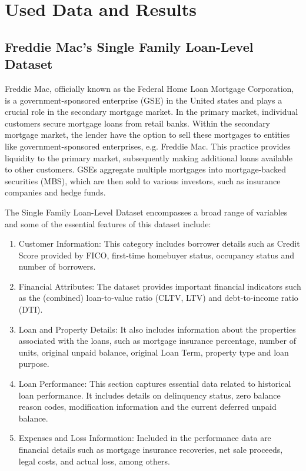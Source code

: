 \chapter{Used Data and Results}

\section{Freddie Mac's Single Family Loan-Level Dataset}

Freddie Mac, officially known as the Federal Home Loan Mortgage Corporation, is a government-sponsored enterprise (GSE) in the United states and plays a crucial role in the secondary mortgage market. In the primary market, individual customers secure mortgage loans from retail banks. Within the secondary mortgage market, the lender have the option to sell these mortgages to entities like government-sponsored enterprises, e.g. Freddie Mac. This practice provides liquidity to the primary market, subsequently making additional loans available to other customers. GSEs aggregate multiple mortgages into mortgage-backed securities (MBS), which are then sold to various investors, such as insurance companies and hedge funds. \cite{FreddieMac:2023} \cite{SecMortMark:2023}

The Single Family Loan-Level Dataset encompasses a broad range of variables and some of the essential features of this dataset include:

\begin{enumerate}
\item Customer Information: This category includes borrower details such as Credit Score provided by FICO, first-time homebuyer status, occupancy status and number of borrowers.
\item Financial Attributes: The dataset provides important financial indicators such as the (combined) loan-to-value ratio (CLTV, LTV) and debt-to-income ratio (DTI).
\item Loan and Property Details: It also includes information about the properties associated with the loans, such as mortgage insurance percentage, number of units, original unpaid balance, original Loan Term, property type and loan purpose.
\item Loan Performance: This section captures essential data related to historical loan performance. It includes details on delinquency status, zero balance reason codes, modification information and the current deferred unpaid balance.
\item Expenses and Loss Information: Included in the performance data are financial details such as mortgage insurance recoveries, net sale proceeds, legal costs, and actual loss, among others.
\end{enumerate}


